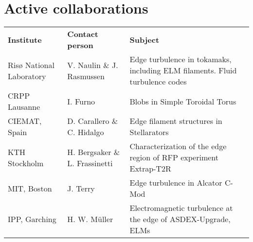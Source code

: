 \section{Active collaborations}
\begin{longtable}{l p{5cm} p{9cm}}
\textbf{Institute} & \textbf{Contact person} & \textbf{Subject} \\
Ris{\o} National Laboratory & V. Naulin \& J. Rasmussen & Edge
turbulence in tokamaks, including ELM filaments. Fluid turbulence codes  \\
CRPP Lausanne & I. Furno & Blobs in Simple Toroidal
Torus \\
CIEMAT, Spain & D. Carallero \& C. Hidalgo & Edge filament structures
in Stellarators \\
KTH Stockholm & H. Bergsaker \& L. Frassinetti & Characterization of
the edge region of RFP experiment Extrap-T2R \\
MIT, Boston & J. Terry & Edge turbulence in Alcator C-Mod \\
IPP, Garching & H. W. M\"uller & Electromagnetic turbulence at the
edge of ASDEX-Upgrade, ELMs

\end{longtable}
